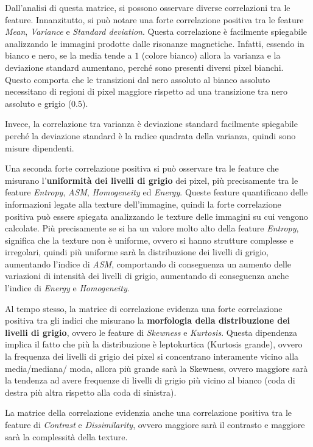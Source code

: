 Dall'analisi di questa matrice, si possono osservare diverse correlazioni tra le
feature. Innanzitutto, si può notare una forte correlazione positiva tra le feature
\textit{Mean}, \textit{Variance} e \textit{Standard deviation}. Questa correlazione
è facilmente spiegabile analizzando le immagini prodotte dalle risonanze magnetiche.
Infatti, essendo in bianco e nero, se la media tende a $1$ (colore bianco) allora
la varianza e la deviazione standard aumentano, perché sono presenti diversi
pixel bianchi. Questo comporta che le transizioni dal nero assoluto al bianco
assoluto necessitano di regioni di pixel maggiore rispetto ad una transizione
tra nero assoluto e grigio ($0.5$).

Invece, la correlazione tra varianza è deviazione standard facilmente spiegabile
perché la deviazione standard è la radice quadrata della varianza, quindi sono 
misure dipendenti.

Una seconda forte correlazione positiva si può osservare tra le feature che
misurano l'\textbf{uniformità dei livelli di grigio} dei pixel, più precisamente
tra le feature \textit{Entropy}, \textit{ASM}, \textit{Homogeneity} ed
\textit{Energy}. Queste feature quantificano delle informazioni legate alla
texture dell'immagine, quindi la forte correlazione positiva può essere spiegata
analizzando le texture delle immagini su cui vengono calcolate. Più precisamente
se si ha un valore molto alto della feature \textit{Entropy}, significa che la
texture non è uniforme, ovvero si hanno strutture complesse e irregolari, quindi
più uniforme sarà la distribuzione dei livelli di grigio, aumentando l'indice
di \textit{ASM}, comportando di conseguenza un aumento delle variazioni di intensità
dei livelli di grigio, aumentando di conseguenza anche l'indice di \textit{Energy}
e \textit{Homogeneity}. 

Al tempo stesso, la matrice di correlazione evidenza una forte correlazione positiva
tra gli indici che misurano la \textbf{morfologia della distribuzione dei livelli 
di grigio}, ovvero le feature di \textit{Skewness} e \textit{Kurtosis}. Questa dipendenza implica il
fatto che più la distribuzione è leptokurtica (Kurtosis grande), ovvero la frequenza
dei livelli di grigio dei pixel si concentrano interamente vicino alla media/mediana/
moda, allora più grande sarà la Skewness, ovvero maggiore sarà la tendenza ad avere
frequenze di livelli di grigio più vicino al bianco (coda di destra più altra rispetto
alla coda di sinistra).

La matrice della correlazione evidenzia anche una correlazione positiva tra le
feature di \textit{Contrast} e \textit{Dissimilarity}, ovvero maggiore sarà il
contrasto e maggiore sarà la complessità della texture.


